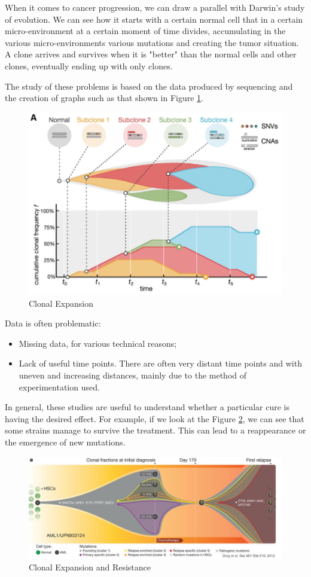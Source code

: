 When it comes to cancer progression, we can draw a parallel with Darwin’s study of evolution. 
We can see how it starts with a certain normal cell that in a certain micro-environment at a
certain moment of time divides, accumulating in the various micro-environments various mutations 
and creating the tumor situation. A clone arrives and survives when it is "better" than the 
normal cells and other clones, eventually ending up with only clones.

The study of these problems is based on the data produced by sequencing and the creation of 
graphs such as that shown in Figure \ref{fig:CE}. 

\begin{figure}[!ht]
    \centering
    \includegraphics[width=0.5\linewidth]{img/CancerProgression/CE.png}
    \caption{Clonal Expansion}
    \label{fig:CE}
\end{figure}

Data is often problematic:
\begin{itemize}
    \item Missing data, for various technical reasons;
    \item Lack of useful time points. There are often very distant time points and with 
        uneven and increasing distances, mainly due to the method of experimentation used.
\end{itemize}

In general, these studies are useful to understand whether a particular cure is having the desired effect. For example, if we look at the Figure \ref{fig:Resistance}, we can see that 
some strains manage to survive the treatment. This can lead to a reappearance or the 
emergence of new mutations.

\begin{figure}[!ht]
    \centering
    \includegraphics[width=0.5\linewidth]{img/CancerProgression/Resistance.png}
    \caption{Clonal Expansion and Resistance}
    \label{fig:Resistance}
\end{figure}

